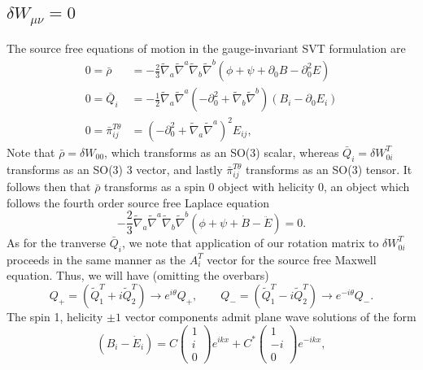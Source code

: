 \documentclass[10pt,letterpaper]{article}
\numberwithin{equation}{subsection}
\begin{document}
\subsection{$\delta W_{\mu\nu} = 0$}
The source free equations of motion in the gauge-invariant SVT formulation are
\begin{align}
0=\bar \rho &= -\frac{2}{3} \tilde{\nabla}_a\tilde{\nabla}^a\tilde{\nabla}_b\tilde{\nabla}^b (\phi + \psi +\partial_0{B}-\partial_0^2{E}) 
\nonumber\\
0=\bar Q_i &= -\frac{1}{2} \tilde{\nabla}_a\tilde{\nabla}^a\left(-\partial_0^2+\tilde{\nabla}_b\tilde{\nabla}^b\right)(B_i - \partial_0{E}_i)
\nonumber \\
0=\bar \pi_{ij}^{T\theta} &= \left(-\partial_0^2 + \tilde\nabla_a\tilde\nabla^a\right)^2 E_{ij},
\end{align}
Note that $\bar \rho = \delta W_{00}$, which transforms as an SO(3) scalar, whereas $\bar Q_i  = \delta W_{0i}^T$ transforms as an SO(3) 3 vector, and lastly $\bar \pi_{ij}^{T\theta}$ transforms as an SO(3) tensor. It follows then that $\bar \rho$ transforms as a spin 0 object with helicity 0, an object which follows the fourth order source free Laplace equation
\begin{equation}
\boxed{
 -\frac{2}{3} \tilde{\nabla}_a\tilde{\nabla}^a\tilde{\nabla}_b\tilde{\nabla}^b (\phi + \psi +\dot{B}-\ddot{E}) =0}.
\end{equation}
As for the tranverse $\bar Q_i$, we note that application of our rotation matrix to $\delta W_{0i}^T$ proceeds in the same manner as the $A_i^T$ vector for the source free Maxwell equation. Thus, we will have (omitting the overbars)
\begin{equation}
 Q_+ = \left(\tilde Q_1^T + i\tilde Q_2^T\right) \to e^{i\theta}  Q_+,\qquad  Q_- = \left(\tilde Q_1^T - i\tilde Q_2^T\right)\to e^{-i\theta}  Q_-.
\end{equation}
The spin 1, helicity $\pm 1$ vector components admit plane wave solutions of the form
\begin{equation}
\boxed{\left(B_i - \dot E_i\right) = C\begin{pmatrix}1\\i\\0\end{pmatrix} e^{ikx} + C^*\begin{pmatrix}1\\-i\\0\end{pmatrix} e^{-ikx}},
\end{equation} 
\end{document}
